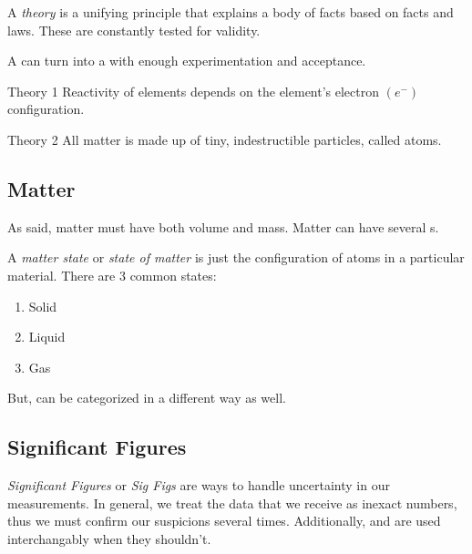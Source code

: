 \begin{definition}[Theory] \label{def:Theory}
  A \emph{theory} is a unifying principle that explains a body of facts based on facts and laws.
  These are constantly tested for validity.
  \begin{remark}
    A  can turn into a  with enough experimentation and acceptance.
  \end{remark}
\end{definition}

\begin{example}[]{Theory 1}
  Reactivity of elements depends on the element's electron $\left( e^{-} \right)$ configuration.
\end{example}

\begin{example}[]{Theory 2}
  All matter is made up of tiny, indestructible particles, called atoms.
\end{example}

\subsection{Matter} \label{subsec:Matter}
As  said, matter must have both volume and mass.
Matter can have several s.

\begin{definition} \label{def:Matter State}
  A \emph{matter state} or \emph{state of matter} is just the configuration of atoms in a particular material.
  There are 3 common states:
  \begin{enumerate}
  \item Solid
  \item Liquid
  \item Gas
  \end{enumerate}
\end{definition}

But,  can be categorized in a different way as well.
% 

\subsection{Significant Figures} \label{subsec:Sig Figs}
\begin{definition} \label{def:Sig Figs}
  \emph{Significant Figures} or \emph{Sig Figs} are ways to handle uncertainty in our measurements.
  In general, we treat the data that we receive as inexact numbers, thus we must confirm our suspicions several times.
  Additionally,  and  are used interchangably when they shouldn't.
\end{definition}

